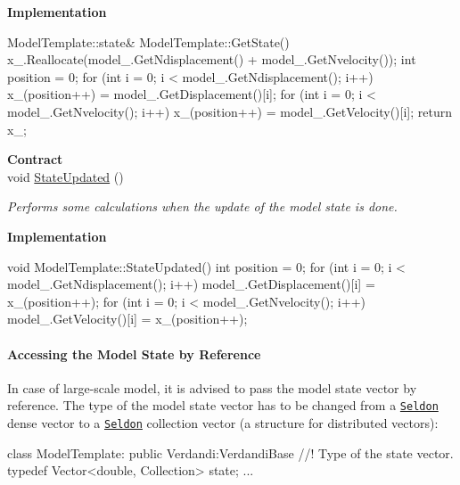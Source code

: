 \documentclass{tufte-book}
\begin{document}
\begin{enumerate}
\textbf{Implementation}\\

\begin{frame_cpp}
    ModelTemplate::state& ModelTemplate::GetState()
    {
        x_.Reallocate(model_.GetNdisplacement() + model_.GetNvelocity());
        int position = 0;
        for (int i = 0; i < model_.GetNdisplacement(); i++)
            x_(position++) = model_.GetDisplacement()[i];
        for (int i = 0; i < model_.GetNvelocity(); i++)
            x_(position++) = model_.GetVelocity()[i];
        return x_;
    }
\end{frame_cpp}


\textbf{Contract}\\
\hypertarget{class_verdandi_1_1_model_template_a885248c5bbe5a173277a551b3f253277}{
void \hyperlink{class_verdandi_1_1_model_template_a885248c5bbe5a173277a551b3f253277}{\-State\-Updated} ()}
\label{class_verdandi_1_1_model_template_a885248c5bbe5a173277a551b3f253277}
\begin{DoxyCompactList}\small\item\em \-Performs some calculations when the update of the model state is done. \end{DoxyCompactList}

\textbf{Implementation}\\

\begin{frame_cpp}
    void ModelTemplate::StateUpdated()
    {
        int position = 0;
        for (int i = 0; i < model_.GetNdisplacement(); i++)
           model_.GetDisplacement()[i] = x_(position++);
        for (int i = 0; i < model_.GetNvelocity(); i++)
            model_.GetVelocity()[i] = x_(position++);
    }
\end{frame_cpp}


\paragraph{Accessing the Model State by Reference}

In case of large-scale model, it is advised to pass the model state vector by reference. The type of the model state vector
has to be changed from a \href{http://www.seldon.sourceforge.net}{\tt \-Seldon}  dense vector to a \href{http://www.seldon.sourceforge.net}{\tt \-Seldon}  collection vector  (a structure for distributed vectors):

\begin{frame_cpp}
class ModelTemplate: public Verdandi:VerdandiBase
{
    //! Type of the state vector.
     typedef Vector<double, Collection> state;
	...
}
\end{frame_cpp}


\end{enumerate}
\end{document}
